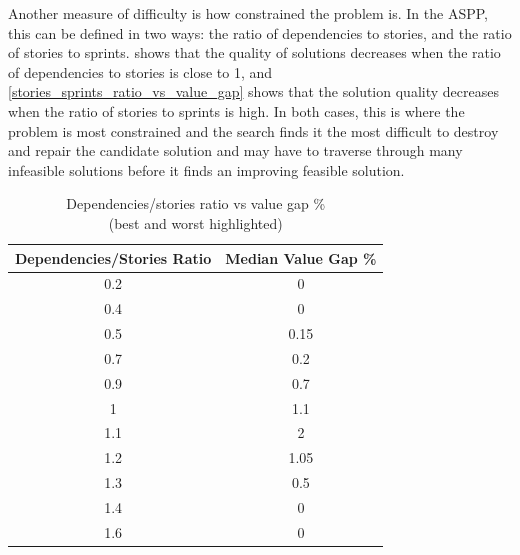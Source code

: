 Another measure of difficulty is how constrained the problem is. In the ASPP, this can be defined in two ways: the ratio of dependencies to stories, and the ratio of stories to sprints.  shows that the quality of solutions decreases when the ratio of dependencies to stories is close to 1, and \cref{stories_sprints_ratio_vs_value_gap} shows that the solution quality decreases when the ratio of stories to sprints is high. In both cases, this is where the problem is most constrained and the search finds it the most difficult to destroy and repair the candidate solution and may have to traverse through many infeasible solutions before it finds an improving feasible solution.

\begin{table}[h!]
\centering
\begin{tabular}{|c|c|}
\hline
\textbf{Dependencies/Stories Ratio} & \textbf{Median Value Gap \%} \\ \hline
\rowcolor[HTML]{67FD9A} 
0.2 & 0 \\ \hline
\rowcolor[HTML]{67FD9A} 
0.4 & 0 \\ \hline
0.5 & 0.15 \\ \hline
0.7 & 0.2 \\ \hline
0.9 & 0.7 \\ \hline
1 & 1.1 \\ \hline
\rowcolor[HTML]{FD6864} 
1.1 & 2 \\ \hline
1.2 & 1.05 \\ \hline
1.3 & 0.5 \\ \hline
\rowcolor[HTML]{67FD9A} 
1.4 & 0 \\ \hline
\rowcolor[HTML]{67FD9A} 
1.6 & 0 \\ \hline
\end{tabular}
\caption{Dependencies/stories ratio vs value gap \%\\(best and worst highlighted)}
\label{dependencies_stories_ratio_vs_value_gap}
\end{table}

